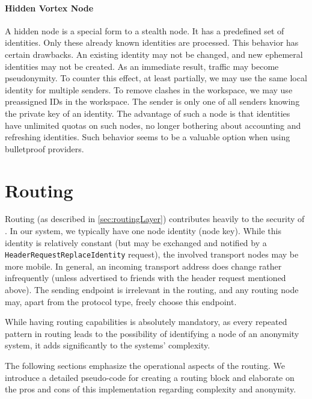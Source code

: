 \subsubsection{Hidden Vortex Node\label{sec:hiddenNode}}
A hidden node is a special form to a stealth node. It has a predefined set of identities. Only these already known identities are processed. This behavior has certain drawbacks. An existing identity may not be changed, and new ephemeral identities may not be created. As an immediate result, traffic may become pseudonymity. To counter this effect, at least partially, we may use the same local identity for multiple senders. To remove clashes in the workspace, we may use preassigned IDs in the workspace. The sender is only one of all senders knowing the private key of an identity. The advantage of such a node is that identities have unlimited quotas on such nodes, no longer bothering about accounting and refreshing identities. Such behavior seems to be a valuable option when using bulletproof providers.

\chapter{Routing}
Routing (as described in \cref{sec:routingLayer}) contributes heavily to the security of \MessageVortex. In our system, we typically have one node identity (node key). While this identity is relatively constant (but may be exchanged and notified by a \texttt{HeaderRequestReplaceIdentity} request), the involved transport nodes may be more mobile. In general, an incoming transport address does change rather infrequently (unless advertised to friends with the header request mentioned above). The sending endpoint is irrelevant in the routing, and any routing node may, apart from the protocol type, freely choose this endpoint. 

While having routing capabilities is absolutely mandatory, as every repeated pattern in routing leads to the possibility of identifying a node of an anonymity system, it adds significantly to the systems' complexity.

The following sections emphasize the operational aspects of the routing. We introduce a detailed pseudo-code for creating a routing block and elaborate on the pros and cons of this implementation regarding complexity and anonymity.

